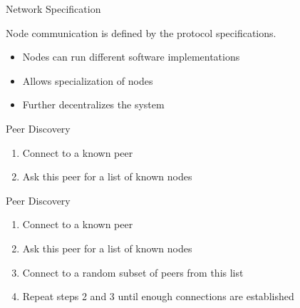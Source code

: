 \documentclass[handout]{beamer}
\begin{document}
\begin{frame}{Network Specification}
	\begin{center}
		\begin{tikzpicture}[scale=0.7, every node/.style={scale=1}]
			
		\end{tikzpicture}
	\end{center}
	\vspace{.5 cm}
	
	Node communication is defined by the \color{focus}protocol specifications\color{black}.
	\begin{itemize}
		\item<2-> Nodes can run different software implementations
		\item<3-> Allows specialization of nodes
		\item<4-> \color{focus}Further decentralizes \color{black}the system
	\end{itemize}
\end{frame}

\begin{frame}{Peer Discovery}
	\begin{center}
		\begin{tikzpicture}[scale=1, every node/.style={scale=1}]
			
		\end{tikzpicture}
	\end{center}
	\begin{enumerate}
		\item<2-> Connect to a known peer
		\item<3-> Ask this peer for a list of known nodes
	\end{enumerate}
	\vspace{1em}
\end{frame}

\begin{frame}{Peer Discovery}
	\begin{center}
		\begin{tikzpicture}[scale=1, every node/.style={scale=1}]
			
		\end{tikzpicture}
	\end{center}
	\begin{enumerate}
		\item Connect to a known peer
		\item Ask this peer for a list of known nodes
		\item Connect to a random subset of peers from this list
		\item<2-> Repeat steps 2 and 3 until enough connections are established
	\end{enumerate}
\end{frame}
\end{document}

